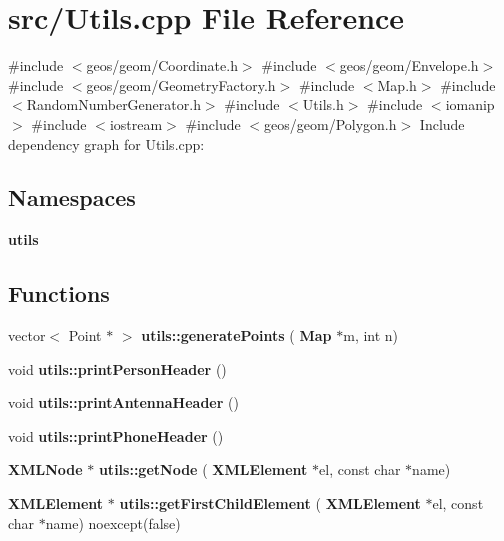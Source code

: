 \section{src/\+Utils.cpp File Reference}
\label{_utils_8cpp}
{\ttfamily \#include $<$geos/geom/\+Coordinate.\+h$>$}\newline
{\ttfamily \#include $<$geos/geom/\+Envelope.\+h$>$}\newline
{\ttfamily \#include $<$geos/geom/\+Geometry\+Factory.\+h$>$}\newline
{\ttfamily \#include $<$Map.\+h$>$}\newline
{\ttfamily \#include $<$Random\+Number\+Generator.\+h$>$}\newline
{\ttfamily \#include $<$Utils.\+h$>$}\newline
{\ttfamily \#include $<$iomanip$>$}\newline
{\ttfamily \#include $<$iostream$>$}\newline
{\ttfamily \#include $<$geos/geom/\+Polygon.\+h$>$}\newline
Include dependency graph for Utils.\+cpp\+:
\subsection*{Namespaces}
\begin{DoxyCompactItemize}
\item 
 \textbf{ utils}
\end{DoxyCompactItemize}
\subsection*{Functions}
\begin{DoxyCompactItemize}
\item 
vector$<$ Point $\ast$ $>$ \textbf{ utils\+::generate\+Points} (\textbf{ Map} $\ast$m, int n)
\item 
void \textbf{ utils\+::print\+Person\+Header} ()
\item 
void \textbf{ utils\+::print\+Antenna\+Header} ()
\item 
void \textbf{ utils\+::print\+Phone\+Header} ()
\item 
\textbf{ X\+M\+L\+Node} $\ast$ \textbf{ utils\+::get\+Node} (\textbf{ X\+M\+L\+Element} $\ast$el, const char $\ast$name)
\item 
\textbf{ X\+M\+L\+Element} $\ast$ \textbf{ utils\+::get\+First\+Child\+Element} (\textbf{ X\+M\+L\+Element} $\ast$el, const char $\ast$name) noexcept(false)
\end{DoxyCompactItemize}
